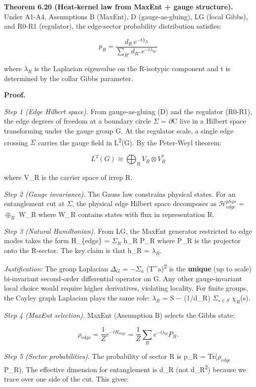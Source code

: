 \documentclass[11pt,a4paper]{article}
\theoremstyle{remark}
\begin{document}
\textbf{Theorem 6.20 (Heat-kernel law from MaxEnt + gauge structure).} Under A1-A4,
Assumptions B (MaxEnt), D (gauge-as-gluing), LG (local Gibbs), and R0-R1
(regulator), the edge-sector probability distribution satisfies:

\[
p_R = \frac{d_R \, e^{-t \lambda_R}}{\sum_{R'} d_{R'} \, e^{-t \lambda_{R'}}}
\]

where \(\lambda_R\) is the Laplacian eigenvalue on the R-isotypic component
and t is determined by the collar Gibbs parameter.

\textbf{Proof.}

\emph{Step 1 (Edge Hilbert space).} From gauge-as-gluing (D) and the regulator
(R0-R1), the edge degrees of freedom at a boundary circle \ensuremath{\Sigma} = \ensuremath{\partial}C
live in a Hilbert space transforming under the gauge group G. At the
regulator scale, a single edge crossing \ensuremath{\Sigma} carries the gauge field in
L\textsuperscript{2}(G). By the Peter-Weyl theorem:

\[
L^2(G) \cong \bigoplus_R V_R \otimes V_R^*
\]

where V\_R is the carrier space of irrep R.

\emph{Step 2 (Gauge invariance).} The Gauss law constrains physical states. For an
entanglement cut at \ensuremath{\Sigma}, the physical edge Hilbert space decomposes as
\(\mathcal{H}_{edge}^{phys}\) = \(\oplus_R\) W\_R where W\_R
contains states with flux in representation R.

\emph{Step 3 (Natural Hamiltonian).} From LG, the MaxEnt generator restricted to
edge modes takes the form H\_\{edge\} = \(\Sigma_R\) h\_R P\_R where P\_R is
the projector onto the R-sector. The key claim is that h\_R = \(\lambda_R\).

\emph{Justification:} The group Laplacian \(\Delta_G\) = \ensuremath{-}\(\Sigma_a\) (T\^{}a)\textsuperscript{2} is the
\textbf{unique} (up to scale) bi-invariant second-order differential operator on
G. Any other gauge-invariant local choice would require higher derivatives,
violating locality. For finite groups, the Cayley graph Laplacian plays the
same role: \(\lambda_R\) = \textbar S\textbar{} \ensuremath{-} (1/d\_R) \(\Sigma_{s\in{}S}\) \(\chi_R\)(s).

\emph{Step 4 (MaxEnt selection).} MaxEnt (Assumption B) selects the Gibbs state:

\[
\rho_{\mathrm{edge}} = \frac{1}{Z} e^{-t H_{\mathrm{edge}}} = \frac{1}{Z}
\sum_R e^{-t \lambda_R} P_R.
\]

\emph{Step 5 (Sector probabilities).} The probability of sector R is
p\_R = Tr(\(\rho_{edge}\) P\_R). The effective dimension for
entanglement is d\_R (not d\_R\textsuperscript{2}) because we trace over one side of the
cut. This gives:
\end{document}
